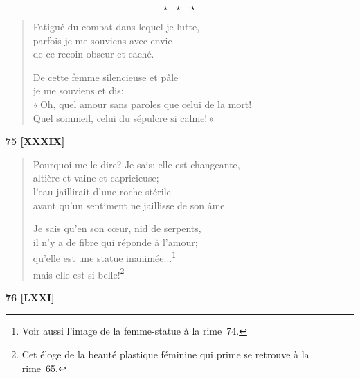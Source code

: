 \[\star \ \ \ \star \ \ \ \star\]

\begin{verse}
  Fatigué du combat
  dans lequel je lutte, \\
  parfois je me souviens avec envie \\
  de ce recoin obscur et caché.

  De cette femme silencieuse et pâle \\
  je me souviens et dis: \\
  «\,Oh, quel amour sans paroles que celui de la mort! \\
    Quel sommeil, celui du sépulcre si calme!\,»
\end{verse}


\begin{center}
  \textbf{75 [XXXIX]}
\end{center}

\begin{verse}
  Pourquoi me le dire? Je sais: elle est changeante,\hspace*{-10pt} \\
  altière et vaine et capricieuse; \\
  l'eau jaillirait d'une roche stérile \\
  avant qu'un sentiment ne jaillisse de son âme.

  Je sais qu'en son cœur, nid de serpents, \\
  il n'y a de fibre qui réponde à l'amour; \\
  qu'elle est une statue inanimée...\footnote{Voir aussi l'image de la
  femme-statue à la rime~74.} \\
  mais elle est si belle!\footnote{Cet éloge de la beauté plastique
  féminine qui prime se retrouve à la rime~65.}
\end{verse}

\bigskip

\begin{center}
  \textbf{76 [LXXI]}
\end{center}

